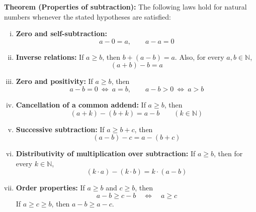 \documentclass[a4paper,11pt,abstracton]{scrartcl}
\newcommand{\NN}{\mathbb{N}}
\theoremstyle{dotlessP}
\theoremstyle{dotlessS}
\theoremstyle{remark}
\theoremstyle{definition}
\begin{document}
\begin{problem_box}
\textbf{Theorem (Properties of subtraction):}
The following laws hold for natural numbers whenever the stated
hypotheses are satisfied:
\begin{enumerate}[(i)]
    \item \textbf{Zero and self-subtraction:}
    \[
        a-0=a,\qquad a-a=0
    \]
    \item \textbf{Inverse relations:} If $a\ge b$, then
    $b+(a-b)=a$. Also, for every $a,b\in\NN$,
    \[
        (a+b)-b=a
    \]
    \item \textbf{Zero and positivity:} If $a\ge b$, then
    \[
        a-b=0\ \Longleftrightarrow\ a=b,
        \qquad a-b>0\ \Longleftrightarrow\ a>b
    \]
    \item \textbf{Cancellation of a common addend:} If $a\ge b$, then
    \[
        (a+k)-(b+k)=a-b\qquad(k\in\NN)
    \]
    \item \textbf{Successive subtraction:} If $a\ge b+c$, then
    \[
        (a-b)-c=a-(b+c)
    \]
    \item \textbf{Distributivity of multiplication over subtraction:}
    If $a\ge b$, then for every $k\in\NN$,
    \[
        (k\cdot a)-(k\cdot b)=k\cdot(a-b)
    \]
    \item \textbf{Order properties:} If $a\ge b$ and $c\ge b$, then
    \[
        a-b\ge c-b\quad\Longleftrightarrow\quad a\ge c
    \]
    If $a\ge c\ge b$, then $a-b\ge a-c$.
\end{enumerate}
\end{problem_box}
\end{document}
